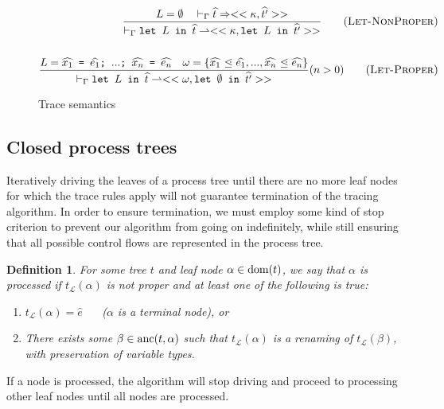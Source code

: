 \documentclass[10pt]{../sigplanconf}
\newcommand{\dom}{\ensuremath{{\rm dom}}}
\newcommand{\anc}{\ensuremath{{\rm anc}}}
\newcommand{\gen}{\ensuremath{~{\leq\kern-6pt \raisebox{1pt}{$\cdot$}}~}}
\newcommand{\nfrac}[2]{\frac{\displaystyle{#1}}{\displaystyle{#2}}}
\newcommand{\tagsc}[1]{\tag{\scshape #1}}
\newtheorem{definition}{Definition}
\begin{document}
\begin{figure}
  ~\newline

  \begin{align}
    \nfrac{
      L=\emptyset \quad |-_\Gamma \widehat{t} => << \kappa, \widehat{t'} >>
    }{
      |-_\Gamma \texttt{let $L$ in $\widehat{t}$} \rightharpoonup <<\kappa, \texttt{let $L$ in $\widehat{t'}$}>>
    } \tagsc{Let-NonProper}
\\\nonumber\\
    \nfrac{
     L = \texttt{$\widehat{x_1}$ = $\widehat{e_1}$; $...$; $\widehat{x_n}$ = $\widehat{e_n}$}\quad
     \omega = \{ \widehat{x_1} \gen \widehat{e_1}, ..., \widehat{x_n} \gen \widehat{e_n} \}
    }{
      |-_\Gamma \texttt{let $L$ in $\widehat{t}$} \rightharpoonup <<\omega, \texttt{let $\emptyset$ in $\widehat{t'}$} >>
    } (n > 0) \tagsc{Let-Proper}
  \end{align}

  \caption{Trace semantics}
  \label{fig:tracing}
\end{figure}


\subsection{Closed process trees}
Iteratively driving the leaves of a process tree until there are no
more leaf nodes for which the trace rules apply will not guarantee
termination of the tracing algorithm. In order to ensure termination,
we must employ some kind of stop criterion to prevent our algorithm
from going on indefinitely, while still ensuring that all possible
control flows are represented in the process tree.
\begin{definition}
  For some tree $t$ and leaf node $\alpha \in \dom(t)$, we say that
  $\alpha$ is \emph{processed} if $t_\mathcal{L}(\alpha)$ is not
  proper and at least one of the following is true:
  \begin{enumerate}
    \item $t_\mathcal{L}(\alpha) = \widehat{e}$ ~~ ($\alpha$ is a terminal node), or
    \item There exists some $\beta \in \anc(t, \alpha)$ such that
      $t_\mathcal{L}(\alpha)$ is a renaming of $t_\mathcal{L}(\beta)$,
      with preservation of variable types.
  \end{enumerate}
\end{definition}
If a node is processed, the algorithm will stop driving and proceed to
processing other leaf nodes until all nodes are processed.
\end{document}
